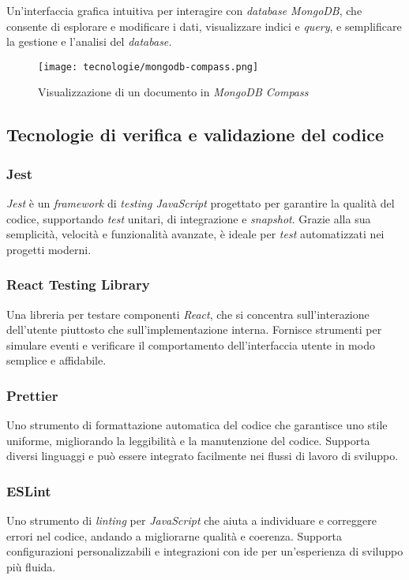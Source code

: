 Un'interfaccia grafica intuitiva per interagire con \textit{database MongoDB}, che consente di esplorare e modificare i dati, visualizzare indici e \textit{query},
e semplificare la gestione e l'analisi del \textit{database.}

\begin{figure}[H]
    \label{fig:mongodb-compass}
    \centering
    \texttt{[image: tecnologie/mongodb-compass.png]}
    \caption{Visualizzazione di un documento in \textit{MongoDB Compass}}
\end{figure}

\subsection{Tecnologie di verifica e validazione del codice}
\label{sez:tecnologie-validazione-codice}

\subsubsection{Jest}

\textit{Jest} è un \textit{framework} di \textit{testing JavaScript} progettato per garantire la qualità del codice, supportando \textit{test} unitari, di integrazione e \textit{snapshot}.
Grazie alla sua semplicità, velocità e funzionalità avanzate, è ideale per \textit{test} automatizzati nei progetti moderni.

\subsubsection{React Testing Library}

Una libreria per testare componenti \textit{React}, che si concentra sull'interazione dell'utente piuttosto che sull'implementazione interna. 
Fornisce strumenti per simulare eventi e verificare il comportamento dell'interfaccia utente in modo semplice e affidabile.

\subsubsection{Prettier}

Uno strumento di formattazione automatica del codice che garantisce uno stile uniforme, migliorando la leggibilità e la manutenzione del codice. 
Supporta diversi linguaggi e può essere integrato facilmente nei flussi di lavoro di sviluppo.

\subsubsection{ESLint}

Uno strumento di \textit{linting} per \textit{JavaScript} che aiuta a individuare e correggere errori nel codice, andando a migliorarne qualità e coerenza.
Supporta configurazioni personalizzabili e integrazioni con \gls{ide} per un'esperienza di sviluppo più fluida.


